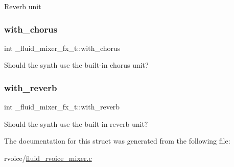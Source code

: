 Reverb unit \mbox{\label{struct__fluid__mixer__fx__t_a61499e4c11e1e8f1771731e2fedd0402}} 
\subsubsection{\texorpdfstring{with\+\_\+chorus}{with\_chorus}}
{\footnotesize\ttfamily int \+\_\+fluid\+\_\+mixer\+\_\+fx\+\_\+t\+::with\+\_\+chorus}

Should the synth use the built-\/in chorus unit? \mbox{\label{struct__fluid__mixer__fx__t_a2b490d27a74d50f69436fff58836df74}} 
\subsubsection{\texorpdfstring{with\+\_\+reverb}{with\_reverb}}
{\footnotesize\ttfamily int \+\_\+fluid\+\_\+mixer\+\_\+fx\+\_\+t\+::with\+\_\+reverb}

Should the synth use the built-\/in reverb unit? 

The documentation for this struct was generated from the following file\+:\begin{DoxyCompactItemize}
\item 
rvoice/\hyperlink{fluid__rvoice__mixer_8c}{fluid\+\_\+rvoice\+\_\+mixer.\+c}\end{DoxyCompactItemize}
